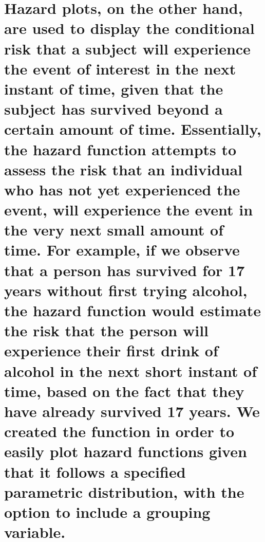 {\section{\texorpdfstring{Hazard plots, on the other hand, are used to
display the conditional risk that a subject will experience the event of
interest in the next instant of time, given that the subject has
survived beyond a certain amount of time. Essentially, the hazard
function attempts to assess the risk that an individual who has not yet
experienced the event, will experience the event in the very next small
amount of time. For example, if we observe that a person has survived
for 17 years without first trying alcohol, the hazard function would
estimate the risk that the person will experience their first drink of
alcohol in the next short instant of time, based on the fact that they
have already survived 17 years. We created the  function
in order to easily plot hazard functions given that it follows a
specified parametric distribution, with the option to include a grouping
variable.}{Hazard plots, on the other hand, are used to display the conditional risk that a subject will experience the event of interest in the next instant of time, given that the subject has survived beyond a certain amount of time. Essentially, the hazard function attempts to assess the risk that an individual who has not yet experienced the event, will experience the event in the very next small amount of time. For example, if we observe that a person has survived for 17 years without first trying alcohol, the hazard function would estimate the risk that the person will experience their first drink of alcohol in the next short instant of time, based on the fact that they have already survived 17 years. We created the  function in order to easily plot hazard functions given that it follows a specified parametric distribution, with the option to include a grouping variable.}}\label{hazard-plots-on-the-other-hand-are-used-to-display-the-conditional-risk-that-a-subject-will-experience-the-event-of-interest-in-the-next-instant-of-time-given-that-the-subject-has-survived-beyond-a-certain-amount-of-time.-essentially-the-hazard-function-attempts-to-assess-the-risk-that-an-individual-who-has-not-yet-experienced-the-event-will-experience-the-event-in-the-very-next-small-amount-of-time.-for-example-if-we-observe-that-a-person-has-survived-for-17-years-without-first-trying-alcohol-the-hazard-function-would-estimate-the-risk-that-the-person-will-experience-their-first-drink-of-alcohol-in-the-next-short-instant-of-time-based-on-the-fact-that-they-have-already-survived-17-years.-we-created-the-function-in-order-to-easily-plot-hazard-functions-given-that-it-follows-a-specified-parametric-distribution-with-the-option-to-include-a-grouping-variable.}}

